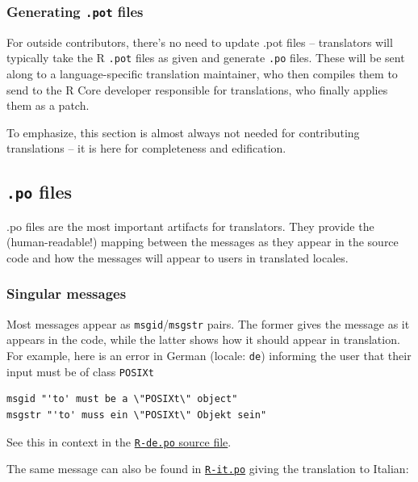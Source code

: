 \documentclass[
]{book}
\begin{document}
\hypertarget{generating-.pot-files}{%
\subsubsection{\texorpdfstring{Generating \texttt{.pot} files}{Generating .pot files}}\label{generating-.pot-files}}

For outside contributors, there's no need to update .pot files -- translators will typically take the R \texttt{.pot} files
as given and generate \texttt{.po} files. These will be sent along to a language-specific translation maintainer, who then
compiles them to send to the R Core developer responsible for translations, who finally applies them as a patch.

To emphasize, this section is almost always not needed for contributing translations -- it is here for
completeness and edification.

\hypertarget{po-files}{%
\subsection{\texorpdfstring{\texttt{.po} files}{.po files}}\label{po-files}}

.po files are the most important artifacts for translators. They provide the (human-readable!) mapping between
the messages as they appear in the source code and how the messages will appear to users in translated locales.

\hypertarget{singular-messages}{%
\subsubsection{Singular messages}\label{singular-messages}}

Most messages appear as \texttt{msgid}/\texttt{msgstr} pairs. The former gives the message as it appears in the code, while the
latter shows how it should appear in translation. For example, here is an error in German (locale: \texttt{de}) informing
the user that their input must be of class \texttt{POSIXt}

\begin{verbatim}
msgid "'to' must be a \"POSIXt\" object"
msgstr "'to' muss ein \"POSIXt\" Objekt sein"
\end{verbatim}

See this in context in the \href{https://svn.r-project.org/R/trunk/src/library/base/po/R-de.po}{\texttt{R-de.po} source file}.

The same message can also be found in
\href{https://svn.r-project.org/R/trunk/src/library/base/po/R-it.po}{\texttt{R-it.po}}
giving the translation to Italian:
\end{document}
